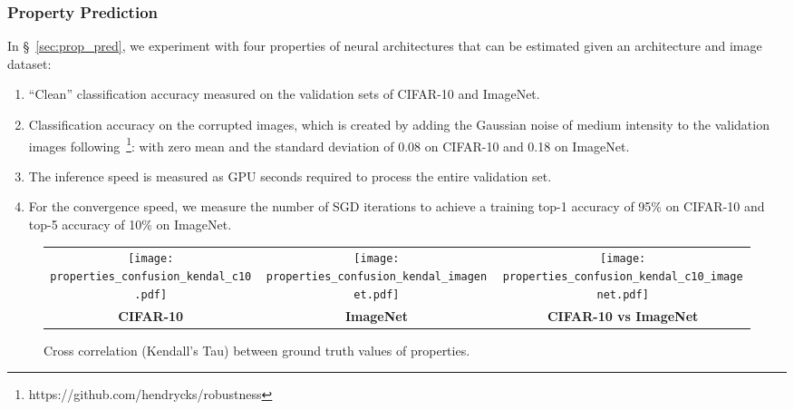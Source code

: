 \subsubsection{Property Prediction\label{apdx:prop}}

In \S~\ref{sec:prop_pred}, we experiment with four properties of neural architectures that can be estimated given an architecture and image dataset:
\begin{enumerate}
	\item ``Clean'' classification accuracy measured on the validation sets of CIFAR-10 and ImageNet.
	\item Classification accuracy on the corrupted images, which is created by adding the Gaussian noise of medium intensity to the validation images following~\cite{hendrycks2019benchmarking}\footnote{https://github.com/hendrycks/robustness}: with zero mean and the standard deviation of 0.08 on CIFAR-10 and 0.18 on ImageNet.
	\item The inference speed is measured as GPU seconds required to process the entire validation set.
	\item For the convergence speed, we measure the number of SGD iterations to achieve a training top-1 accuracy of 95\% on CIFAR-10 and top-5 accuracy of 10\% on ImageNet.
\end{enumerate}

\begin{figure}[tbhp]
	\centering
	\vspace{-10pt}
	\small
	\setlength{\tabcolsep}{0pt}
	\begin{tabular}{ccc}
		{\texttt{[image: properties\_confusion\_kendal\_c10.pdf]}} & {\texttt{[image: properties\_confusion\_kendal\_imagenet.pdf]}} &
		{\texttt{[image: properties\_confusion\_kendal\_c10\_imagenet.pdf]}}\\
		\textbf{CIFAR-10} & \textbf{ImageNet} & \textbf{CIFAR-10 vs ImageNet} \vspace{0pt}\\
	\end{tabular}
	\vspace{-5pt}
	\caption{Cross correlation (Kendall's Tau) between ground truth values of properties.}
	\label{fig:properties_cross}
	\vspace{-5pt}
\end{figure}

